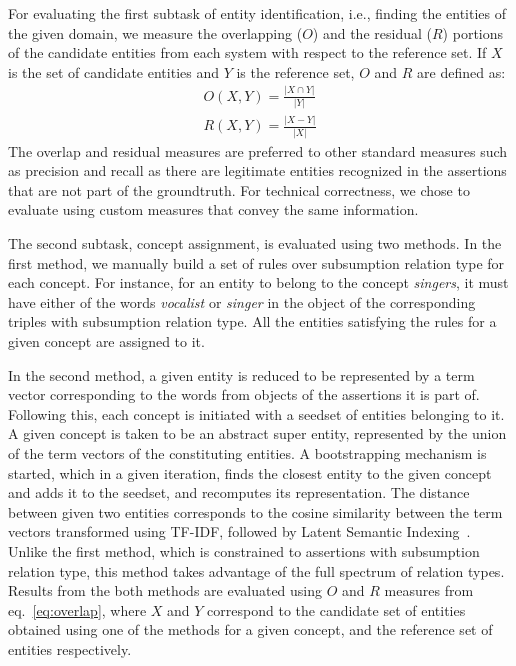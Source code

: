 \documentclass{llncs}
\begin{document}
For evaluating the first subtask of entity identification, i.e., finding the entities of the given domain, we measure the overlapping ($O$) and the residual ($R$) portions of the candidate entities from each system with respect to the reference set. If $X$ is the set of candidate entities and $Y$ is the reference set, $O$ and $R$ are defined as:
\begin{eqnarray}
\label{eq:overlap}
O(X, Y) = \frac{\left|X \cap Y \right|}{\left|Y\right|} \\\nonumber
R(X, Y) = \frac{\left|X - Y \right|}{\left|X\right|}
\end{eqnarray}
The overlap and residual measures are preferred to other standard measures such as precision and recall as there are legitimate entities recognized in the assertions that are not part of the groundtruth. For technical correctness, we chose to evaluate using custom measures that convey the same information.

The second subtask, concept assignment, is evaluated using two methods. In the first method, we manually build a set of rules over subsumption relation type for each concept. For instance, for an entity to belong to the concept \textit{singers}, it must have either of the words \textit{vocalist} or \textit{singer} in the object of the corresponding triples with subsumption relation type. All the entities satisfying the rules for a given concept are assigned to it.

In the second method, a given entity is reduced to be represented by a term vector corresponding to the words from objects of the assertions it is part of. Following this, each concept is initiated with a seedset of entities belonging to it. A given concept is taken to be an abstract super entity, represented by the union of the term vectors of the constituting entities. A bootstrapping mechanism is started, which in a given iteration, finds the closest entity to the given concept and adds it to the seedset, and recomputes its representation. The distance between given two entities corresponds to the cosine similarity between the term vectors transformed using TF-IDF, followed by Latent Semantic Indexing~\cite{rehurek_lrec}. Unlike the first method, which is constrained to assertions with subsumption relation type, this method takes advantage of the full spectrum of relation types. Results from the both methods are evaluated using $O$ and $R$ measures from eq.~\ref{eq:overlap}, where $X$ and $Y$ correspond to the candidate set of entities obtained using one of the methods for a given concept, and the reference set of entities respectively.
\end{document}
